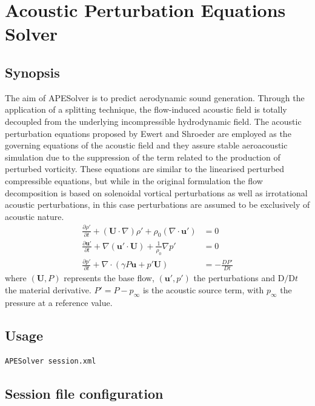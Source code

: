 \chapter{Acoustic Perturbation Equations Solver}

\section{Synopsis}
The aim of APESolver is to predict aerodynamic sound generation. Through
the application of a splitting technique, the flow-induced acoustic field is
totally decoupled from the underlying incompressible hydrodynamic field. The
acoustic perturbation equations proposed by Ewert and Shroeder are employed as
the governing equations of the acoustic field and they assure stable
aeroacoustic simulation due to the suppression of the term related to the
production of perturbed vorticity. These equations are similar to the linearised
perturbed compressible equations, but while in the original formulation the flow
decomposition is based on solenoidal vortical perturbations as well as
irrotational acoustic perturbations, in this case perturbations are assumed to
be exclusively of acoustic nature.
\begin{align*}
      \frac{\partial \rho'}{\partial t} 
        + (\mathbf{U}\cdot \nabla)\rho'+\rho_0(\nabla \cdot \mathbf{u}') &= 0 \\
      \frac{\partial \mathbf{u}'}{\partial t}
        +\nabla(\mathbf{u}' \cdot \mathbf{U})+\frac{1}{\rho_0}\nabla p' &= 0 \\
      \frac{\partial p'}{\partial t}
        +\nabla \cdot (\gamma P \mathbf{u}+p'\mathbf{U})&=-\frac{DP'}{Dt}
\end{align*}
where $(\mathbf{U},P)$ represents the base flow, $(\mathbf{u}',p')$
the perturbations and $\mathrm{D}/\mathrm{D}t$ the material derivative.
$P'=P-p_{\infty}$ is the acoustic source term, with $p_\infty$
the pressure at a reference value.

\section{Usage}
\begin{lstlisting}[style=BashInputStyle]
APESolver session.xml
\end{lstlisting}

\section{Session file configuration}

